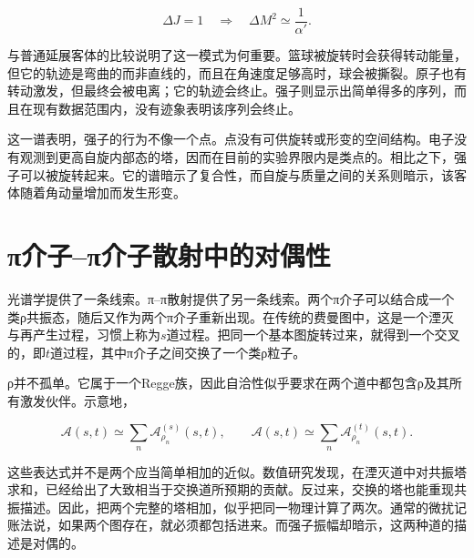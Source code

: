 \begin{equation}
  \Delta J=1
  \quad\Longrightarrow\quad
  \Delta M^2\simeq \frac{1}{\alpha'}.
  \label{eq:l01-regge-spacing}
\end{equation}

\begin{classroomqa}
\end{classroomqa}

与普通延展客体的比较说明了这一模式为何重要。篮球被旋转时会获得转动能量，但它的轨迹是弯曲的而非直线的，而且在角速度足够高时，球会被撕裂。原子也有转动激发，但最终会被电离；它的轨迹会终止。强子则显示出简单得多的序列，而且在现有数据范围内，没有迹象表明该序列会终止。

这一谱表明，强子的行为不像一个点。点没有可供旋转或形变的空间结构。电子没有观测到更高自旋内部态的塔，因而在目前的实验界限内是类点的。相比之下，强子可以被旋转起来。它的谱暗示了复合性，而自旋与质量之间的关系则暗示，该客体随着角动量增加而发生形变。

\section{{\proseunicodefont π}介子--{\proseunicodefont π}介子散射中的对偶性}

光谱学提供了一条线索。{\proseunicodefont π}--{\proseunicodefont π}散射提供了另一条线索。两个{\proseunicodefont π}介子可以结合成一个类{\proseunicodefont ρ}共振态，随后又作为两个{\proseunicodefont π}介子重新出现。在传统的费曼图中，这是一个湮灭与再产生过程，习惯上称为\(s\)道过程。把同一个基本图旋转过来，就得到一个交叉的，即\(t\)道过程，其中{\proseunicodefont π}介子之间交换了一个类{\proseunicodefont ρ}粒子。

{\proseunicodefont ρ}并不孤单。它属于一个Regge族，因此自洽性似乎要求在两个道中都包含{\proseunicodefont ρ}及其所有激发伙伴。示意地，

\begin{equation}
  \mathcal A(s,t)\simeq
  \sum_n \mathcal A^{(s)}_{\rho_n}(s,t),
  \qquad
  \mathcal A(s,t)\simeq
  \sum_n \mathcal A^{(t)}_{\rho_n}(s,t).
  \label{eq:l01-channel-sums}
\end{equation}

这些表达式并不是两个应当简单相加的近似。数值研究发现，在湮灭道中对共振塔求和，已经给出了大致相当于交换道所预期的贡献。反过来，交换的塔也能重现共振描述。因此，把两个完整的塔相加，似乎把同一物理计算了两次。通常的微扰记账法说，如果两个图存在，就必须都包括进来。而强子振幅却暗示，这两种道的描述是对偶的。

